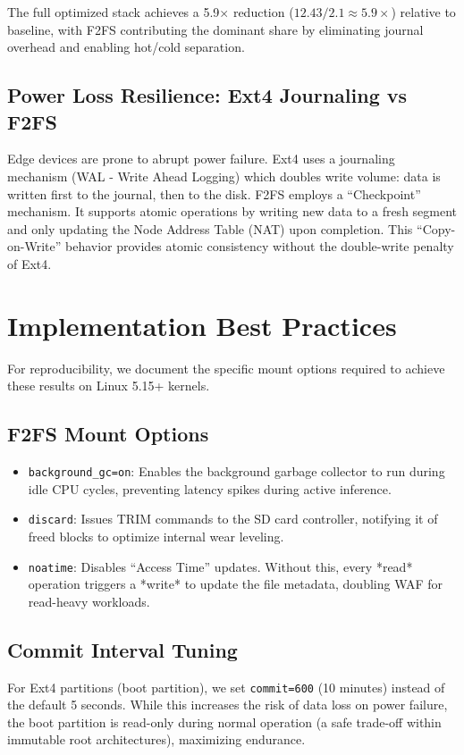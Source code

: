 \documentclass[conference]{IEEEtran}
\begin{document}
The full optimized stack achieves a 5.9$\times$ reduction ($12.43 / 2.1 \approx 5.9\times$) relative to baseline, with F2FS contributing the dominant share by eliminating journal overhead and enabling hot/cold separation.

\subsection{Power Loss Resilience: Ext4 Journaling vs F2FS}
Edge devices are prone to abrupt power failure. Ext4 uses a journaling mechanism (WAL - Write Ahead Logging) which doubles write volume: data is written first to the journal, then to the disk. F2FS employs a ``Checkpoint'' mechanism. It supports atomic operations by writing new data to a fresh segment and only updating the Node Address Table (NAT) upon completion. This ``Copy-on-Write'' behavior provides atomic consistency without the double-write penalty of Ext4.

\section{Implementation Best Practices}

For reproducibility, we document the specific mount options required to achieve these results on Linux 5.15+ kernels.

\subsection{F2FS Mount Options}
\begin{itemize}
    \item \texttt{background\_gc=on}: Enables the background garbage collector to run during idle CPU cycles, preventing latency spikes during active inference.
    \item \texttt{discard}: Issues TRIM commands to the SD card controller, notifying it of freed blocks to optimize internal wear leveling.
    \item \texttt{noatime}: Disables ``Access Time'' updates. Without this, every *read* operation triggers a *write* to update the file metadata, doubling WAF for read-heavy workloads.
\end{itemize}

\subsection{Commit Interval Tuning}
For Ext4 partitions (boot partition), we set \texttt{commit=600} (10 minutes) instead of the default 5 seconds. While this increases the risk of data loss on power failure, the boot partition is read-only during normal operation (a safe trade-off within immutable root architectures), maximizing endurance.
\end{document}
